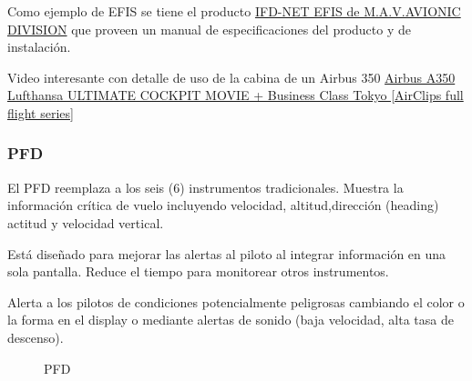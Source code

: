 Como ejemplo de \ac{EFIS} se tiene el producto 
\href{http://www.ifd-net.com/}{IFD-NET EFIS de M.A.V.AVIONIC DIVISION}  que proveen un manual de especificaciones del producto y de instalaci\'on.


Video interesante con detalle de uso de la cabina de un Airbus 350 
\href{https://www.youtube.com/watch?v=jk-WClye4bw}{Airbus A350 Lufthansa ULTIMATE COCKPIT MOVIE + Business Class Tokyo [AirClips full flight series]}


\subsubsection{\ac{PFD}}
\label{sec:01.pfd}

	El PFD reemplaza a los seis (6) instrumentos tradicionales.
	Muestra la informaci\'on cr\'itica de vuelo 
	incluyendo velocidad, altitud,direcci\'on (heading)
	actitud y velocidad vertical.

	Est\'a dise\~nado para mejorar las alertas al piloto
	al integrar informaci\'on en una sola pantalla.
	Reduce el tiempo para monitorear otros instrumentos.

	Alerta a los pilotos de condiciones potencialmente peligrosas
        cambiando el color o la forma en el display o mediante alertas
        de sonido (baja velocidad, alta tasa de descenso). 

        \begin{figure}[!htb]
          \centering
          
          \caption{PFD}
      \label{fig:01.pfd}
    \end{figure}


